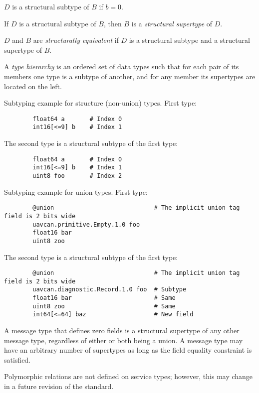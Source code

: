 $D$ is a structural subtype of $B$ if $b = 0$.

If $D$ is a structural subtype of $B$, then $B$ is a \emph{structural supertype} of $D$.

$D$ and $B$ are \emph{structurally equivalent} if $D$ is a structural subtype and a structural supertype of $B$.

A \emph{type hierarchy} is an ordered set of data types such that for each pair of its members
one type is a subtype of another, and for any member its supertypes are located on the left.

\begin{remark}
    Subtyping example for structure (non-union) types. First type:

    \begin{verbatim}
        float64 a       # Index 0
        int16[<=9] b    # Index 1
    \end{verbatim}

    The second type is a structural subtype of the first type:

    \begin{verbatim}
        float64 a       # Index 0
        int16[<=9] b    # Index 1
        uint8 foo       # Index 2
    \end{verbatim}

    Subtyping example for union types. First type:

    \begin{verbatim}
        @union                            # The implicit union tag field is 2 bits wide
        uavcan.primitive.Empty.1.0 foo
        float16 bar
        uint8 zoo
    \end{verbatim}

    The second type is a structural subtype of the first type:

    \begin{verbatim}
        @union                            # The implicit union tag field is 2 bits wide
        uavcan.diagnostic.Record.1.0 foo  # Subtype
        float16 bar                       # Same
        uint8 zoo                         # Same
        int64[<=64] baz                   # New field
    \end{verbatim}

    A message type that defines zero fields is a structural supertype of any other message type, regardless of either
    or both being a union.
    A message type may have an arbitrary number of supertypes as long as the field equality constraint is satisfied.

    Polymorphic relations are not defined on service types;
    however, this may change in a future revision of the standard.
\end{remark}

